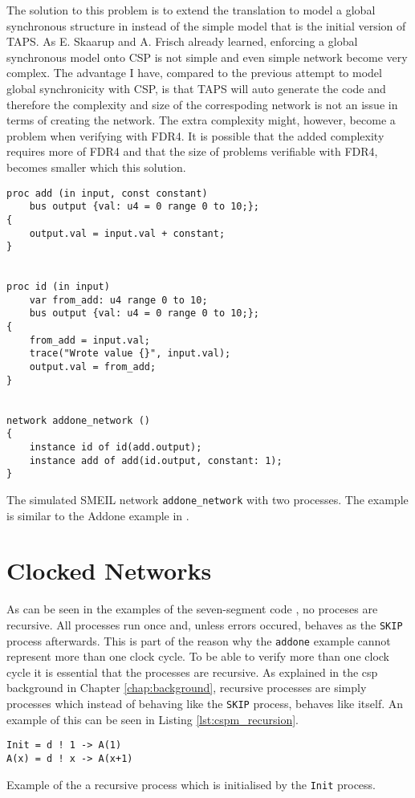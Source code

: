 The solution to this problem is to extend the translation to model a global synchronous structure in \cspm{} instead of the simple model that is the initial version of TAPS. As E. Skaarup and A. Frisch already learned, enforcing a global synchronous model onto CSP is not simple and even simple network become very complex. The advantage I have, compared to the previous attempt to model global synchronicity with CSP, is that TAPS will auto generate the \cspm{} code and therefore the complexity and size of the correspoding \cspm{} network is not an issue in terms of creating the network. The extra complexity might, however, become a problem when verifying with FDR4. It is possible that the added complexity requires more of FDR4 and that the size of problems verifiable with FDR4, becomes smaller which this solution.
\begin{listing}
\begin{verbatim}
proc add (in input, const constant)
    bus output {val: u4 = 0 range 0 to 10;};
{
    output.val = input.val + constant;
}


proc id (in input)
    var from_add: u4 range 0 to 10;
    bus output {val: u4 = 0 range 0 to 10;};
{
    from_add = input.val;
    trace("Wrote value {}", input.val);
    output.val = from_add;
}


network addone_network ()
{
    instance id of id(add.output);
    instance add of add(id.output, constant: 1);
}
\end{verbatim}
\caption{The simulated SMEIL network \texttt{addone\_network} with two processes. The example is similar to the Addone example in \cite{smeil}.}
\label{lst:addone_smeil_example}
\end{listing}
\section{Clocked Networks}
As can be seen in the examples of the seven-segment \cspm{} code %
, no proceses are recursive. All processes run once and, unless errors occured, behaves as the \texttt{SKIP} process afterwards. This is part of the reason why the \texttt{addone} example cannot represent more than one clock cycle. To be able to verify more than one clock cycle it is essential that the processes are recursive. As explained in the csp background in Chapter \ref{chap:background}, recursive processes are simply processes which instead of behaving like the \texttt{SKIP} process, behaves like itself. An example of this can be seen in Listing \ref{lst:cspm_recursion}.
\begin{listing}
\begin{verbatim}
Init = d ! 1 -> A(1)
A(x) = d ! x -> A(x+1)
\end{verbatim}
\caption{Example of the a recursive \cspm{} process which is initialised by the \texttt{Init} process.}
\label{lst:cspm_recursion}
\end{listing}

